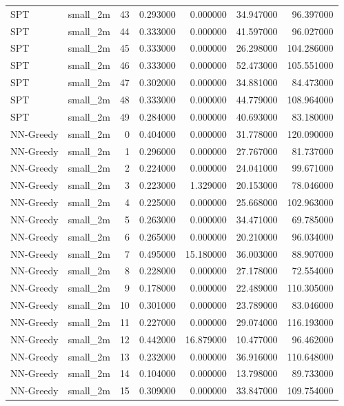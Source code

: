 \begin{tabular}{llrrrrr}
SPT & small_2m & 43 & 0.293000 & 0.000000 & 34.947000 & 96.397000 \\
SPT & small_2m & 44 & 0.333000 & 0.000000 & 41.597000 & 96.027000 \\
SPT & small_2m & 45 & 0.333000 & 0.000000 & 26.298000 & 104.286000 \\
SPT & small_2m & 46 & 0.333000 & 0.000000 & 52.473000 & 105.551000 \\
SPT & small_2m & 47 & 0.302000 & 0.000000 & 34.881000 & 84.473000 \\
SPT & small_2m & 48 & 0.333000 & 0.000000 & 44.779000 & 108.964000 \\
SPT & small_2m & 49 & 0.284000 & 0.000000 & 40.693000 & 83.180000 \\
NN-Greedy & small_2m & 0 & 0.404000 & 0.000000 & 31.778000 & 120.090000 \\
NN-Greedy & small_2m & 1 & 0.296000 & 0.000000 & 27.767000 & 81.737000 \\
NN-Greedy & small_2m & 2 & 0.224000 & 0.000000 & 24.041000 & 99.671000 \\
NN-Greedy & small_2m & 3 & 0.223000 & 1.329000 & 20.153000 & 78.046000 \\
NN-Greedy & small_2m & 4 & 0.225000 & 0.000000 & 25.668000 & 102.963000 \\
NN-Greedy & small_2m & 5 & 0.263000 & 0.000000 & 34.471000 & 69.785000 \\
NN-Greedy & small_2m & 6 & 0.265000 & 0.000000 & 20.210000 & 96.034000 \\
NN-Greedy & small_2m & 7 & 0.495000 & 15.180000 & 36.003000 & 88.907000 \\
NN-Greedy & small_2m & 8 & 0.228000 & 0.000000 & 27.178000 & 72.554000 \\
NN-Greedy & small_2m & 9 & 0.178000 & 0.000000 & 22.489000 & 110.305000 \\
NN-Greedy & small_2m & 10 & 0.301000 & 0.000000 & 23.789000 & 83.046000 \\
NN-Greedy & small_2m & 11 & 0.227000 & 0.000000 & 29.074000 & 116.193000 \\
NN-Greedy & small_2m & 12 & 0.442000 & 16.879000 & 10.477000 & 96.462000 \\
NN-Greedy & small_2m & 13 & 0.232000 & 0.000000 & 36.916000 & 110.648000 \\
NN-Greedy & small_2m & 14 & 0.104000 & 0.000000 & 13.798000 & 89.733000 \\
NN-Greedy & small_2m & 15 & 0.309000 & 0.000000 & 33.847000 & 109.754000 \\

\end{tabular}
